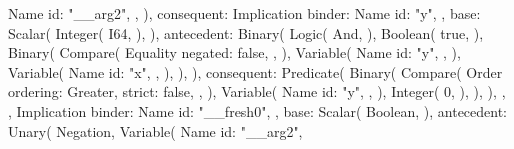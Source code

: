 \documentclass[
  oneside,
  english,
  coorientadorbanca,
  noabntexcite
]{ufsc-thesis-rn46-2019}
\begin{document}
\begin{rustcode}
{{{                        Name {
                            id: "__arg2",
                        },
                    ),
                    consequent: Implication {
                        binder: Name {
                            id: "y",
                        },
                        base: Scalar(
                            Integer(
                                I64,
                            ),
                        ),
                        antecedent: Binary(
                            Logic(
                                And,
                            ),
                            Boolean(
                                true,
                            ),
                            Binary(
                                Compare(
                                    Equality {
                                        negated: false,
                                    },
                                ),
                                Variable(
                                    Name {
                                        id: "y",
                                    },
                                ),
                                Variable(
                                    Name {
                                        id: "x",
                                    },
                                ),
                            ),
                        ),
                        consequent: Predicate(
                            Binary(
                                Compare(
                                    Order {
                                        ordering: Greater,
                                        strict: false,
                                    },
                                ),
                                Variable(
                                    Name {
                                        id: "y",
                                    },
                                ),
                                Integer(
                                    0,
                                ),
                            ),
                        ),
                    },
                },
                Implication {
                    binder: Name {
                        id: "__fresh0",
                    },
                    base: Scalar(
                        Boolean,
                    ),
                    antecedent: Unary(
                        Negation,
                        Variable(
                            Name {
                                id: "__arg2",
}}}}
\end{rustcode}
\end{document}
